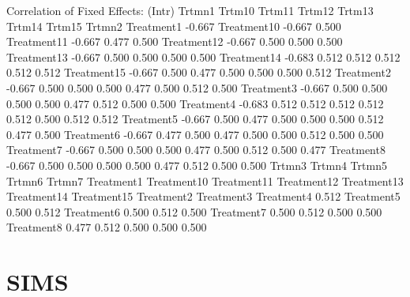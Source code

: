 \documentclass[12pt]{article}
\begin{document}
\begin{Schunk}
\begin{Soutput}
Correlation of Fixed Effects:
            (Intr) Trtmn1 Trtm10 Trtm11 Trtm12 Trtm13 Trtm14 Trtm15 Trtmn2
Treatment1  -0.667                                                        
Treatment10 -0.667  0.500                                                 
Treatment11 -0.667  0.477  0.500                                          
Treatment12 -0.667  0.500  0.500  0.500                                   
Treatment13 -0.667  0.500  0.500  0.500  0.500                            
Treatment14 -0.683  0.512  0.512  0.512  0.512  0.512                     
Treatment15 -0.667  0.500  0.477  0.500  0.500  0.500  0.512              
Treatment2  -0.667  0.500  0.500  0.500  0.477  0.500  0.512  0.500       
Treatment3  -0.667  0.500  0.500  0.500  0.500  0.477  0.512  0.500  0.500
Treatment4  -0.683  0.512  0.512  0.512  0.512  0.512  0.500  0.512  0.512
Treatment5  -0.667  0.500  0.477  0.500  0.500  0.500  0.512  0.477  0.500
Treatment6  -0.667  0.477  0.500  0.477  0.500  0.500  0.512  0.500  0.500
Treatment7  -0.667  0.500  0.500  0.500  0.477  0.500  0.512  0.500  0.477
Treatment8  -0.667  0.500  0.500  0.500  0.500  0.477  0.512  0.500  0.500
            Trtmn3 Trtmn4 Trtmn5 Trtmn6 Trtmn7
Treatment1                                    
Treatment10                                   
Treatment11                                   
Treatment12                                   
Treatment13                                   
Treatment14                                   
Treatment15                                   
Treatment2                                    
Treatment3                                    
Treatment4   0.512                            
Treatment5   0.500  0.512                     
Treatment6   0.500  0.512  0.500              
Treatment7   0.500  0.512  0.500  0.500       
Treatment8   0.477  0.512  0.500  0.500  0.500
\end{Soutput}
\end{Schunk}


\section{SIMS}
\label{sec:SIMS}
\end{document}
